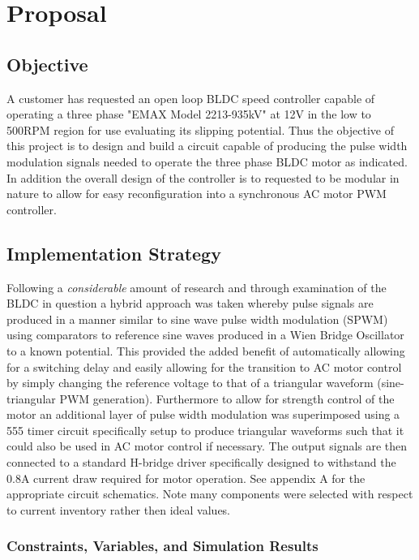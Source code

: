 \documentclass[12pt]{article}
\begin{document}
\section{Proposal}

\subsection{Objective}%

A customer has requested an open loop BLDC speed controller capable of operating a three phase "EMAX Model 2213-935kV" at 12V in the low to 500RPM region for use evaluating its slipping potential. Thus the objective of this project is to design and build a circuit capable of producing the pulse width modulation signals needed to operate the three phase BLDC motor as indicated. In addition the overall design of the controller is to requested to be modular in nature to allow for easy reconfiguration into a synchronous AC motor PWM controller.

\subsection{Implementation Strategy}

Following a \emph{considerable} amount of research and through examination of the BLDC in question a hybrid approach was taken whereby pulse signals are produced in a manner similar to sine wave pulse width modulation (SPWM) using comparators to reference sine waves produced in a Wien Bridge Oscillator to a known potential. This provided the added benefit of automatically allowing for a switching delay and easily allowing for the transition to AC motor control by simply changing the reference voltage to that of a triangular waveform (sine-triangular PWM generation). Furthermore to allow for strength control of the motor an additional layer of pulse width modulation was superimposed using a 555 timer circuit specifically setup to produce triangular waveforms such that it could also be used in AC motor control if necessary. The output signals are then connected to a standard H-bridge driver specifically designed to withstand the 0.8A current draw required for motor operation. See appendix A for the appropriate circuit schematics. Note many components were selected with respect to current inventory rather then ideal values.

\subsubsection{Constraints, Variables, and Simulation Results}
\end{document}
